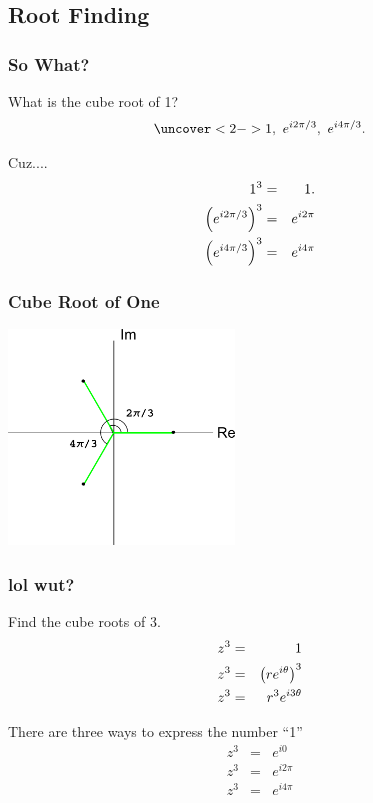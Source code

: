 \subsection{Root Finding}

\begin{frame}
  \frametitle{So What?}

  What is the cube root of 1?
  \begin{eqnarray*}
    \uncover<2->{1,~e^{i2\pi/3},~e^{i4\pi/3}}.
  \end{eqnarray*}

  {
    Cuz....
    \begin{eqnarray*}
      1^3 & = & 1. \\
      \left( e^{i2\pi/3} \right)^3 & = &  e^{i2\pi} \\
      \left( e^{i4\pi/3} \right)^3 & = & e^{i4\pi}
    \end{eqnarray*}


  }

  
\end{frame}

\begin{frame}
  \frametitle{Cube Root of One}
  \centerline{\includegraphics[width=6cm]{img/cubeRoot}}
\end{frame}



\begin{frame}
  \frametitle{lol wut?}

  Find the cube roots of 3.
  \begin{eqnarray*}
    z^3 & = & 1 \\
    z^3 & = & \left( r e^{i\theta} \right)^3 \\
    z^3 & = & r^3 e^{i3\theta}
  \end{eqnarray*}

  There are three ways to express the number ``1''
  \begin{eqnarray*}
    z^3 & = & e^{i0} \\
    z^3 & = & e^{i2\pi} \\
    z^3 & = & e^{i4\pi}
  \end{eqnarray*}
  
\end{frame}

